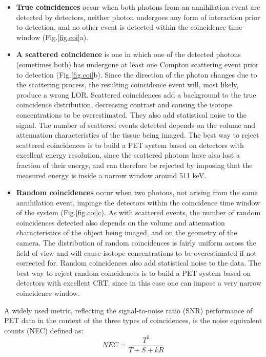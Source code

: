 \documentclass[review]{elsarticle}
\begin{document}
\begin{itemize}
\item {\bf True coincidences} occur when both photons from an annihilation event are detected by detectors, neither photon undergoes any form of interaction prior to detection, and no other event is detected within the coincidence time-window (Fig.\ref{fig.coi}a).
\item {\bf A scattered coincidence} is one in which one of the detected photons (sometimes both) has undergone at least one Compton scattering event prior to detection (Fig.\ref{fig.coi}b). Since the direction of the photon changes due to the scattering process, the resulting coincidence event will, most likely, produce a wrong LOR. Scattered coincidences add a background to the true coincidence distribution, decreasing contrast and causing the isotope concentrations to be overestimated. They also add statistical noise to the signal. The number of scattered events detected depends on the volume and attenuation characteristics of the tissue being imaged. The best way to reject scattered coincidences is to build a PET system based on detectors with excellent energy resolution, since the scattered photons have also lost a fraction of their energy, and can therefore be rejected by imposing that the measured energy is inside a narrow window around 511 keV.
\item {\bf Random coincidences} occur when two photons, not arising from the same annihilation event, impinge the detectors within the coincidence time window of the system (Fig.\ref{fig.coi}c). As with scattered events, the number of random coincidences detected also depends on the volume and attenuation characteristics of the object being imaged, and on the geometry of the camera. The distribution of random coincidences is fairly uniform across the field of view and will cause isotope concentrations to be overestimated if not corrected for. Random coincidences also add statistical noise to the data. The best way to reject random coincidences is to build a PET system based on detectors with excellent CRT, since in this case one can impose a very narrow coincidence window. 
\end{itemize}

 A widely used
metric, reflecting the signal-to-noise ratio (SNR) performance of PET data in the context of
the three types of coincidences, is the noise equivalent counts (NEC) defined as: 
%
\begin{equation}
NEC = \frac{T^2}{T+S+kR}
\label{eq.neq}
\end{equation}
\end{document}
